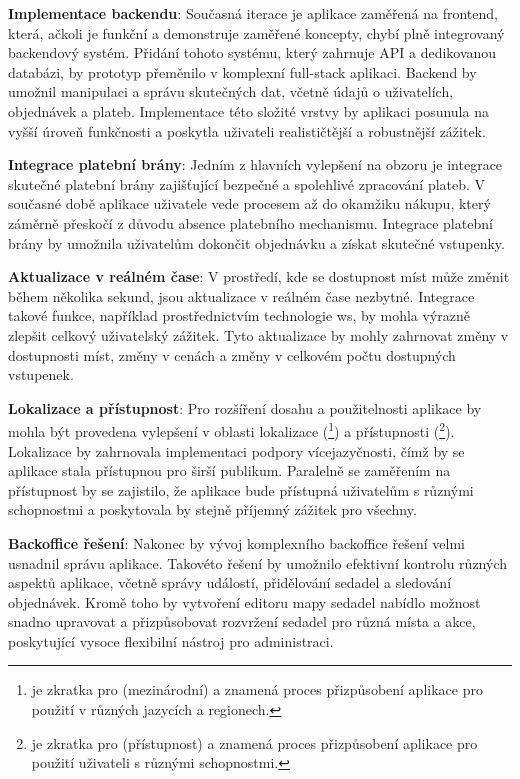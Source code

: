 \textbf{Implementace backendu}: Současná iterace je aplikace zaměřená na frontend, která, ačkoli je funkční a demonstruje zaměřené koncepty, chybí plně integrovaný backendový systém.
Přidání tohoto systému, který zahrnuje API a dedikovanou databázi, by prototyp přeměnilo v komplexní full-stack aplikaci.
Backend by umožnil manipulaci a správu skutečných dat, včetně údajů o uživatelích, objednávek a plateb.
Implementace této složité vrstvy by aplikaci posunula na vyšší úroveň funkčnosti a poskytla uživateli realističtější a robustnější zážitek.

\textbf{Integrace platební brány}: Jedním z hlavních vylepšení na obzoru je integrace skutečné platební brány zajišťující bezpečné a spolehlivé zpracování plateb.
V současné době aplikace uživatele vede procesem až do okamžiku nákupu, který záměrně přeskočí z důvodu absence platebního mechanismu.
Integrace platební brány by umožnila uživatelům dokončit objednávku a získat skutečné vstupenky.

\textbf{Aktualizace v reálném čase}: V prostředí, kde se dostupnost míst může změnit během několika sekund, jsou aktualizace v reálném čase nezbytné.
Integrace takové funkce, například prostřednictvím technologie \ac{ws}, by mohla výrazně zlepšit celkový uživatelský zážitek.
Tyto aktualizace by mohly zahrnovat změny v dostupnosti míst, změny v cenách a změny v celkovém počtu dostupných vstupenek.

\textbf{Lokalizace a přístupnost}: Pro rozšíření dosahu a použitelnosti aplikace by mohla být provedena vylepšení v oblasti lokalizace (\footnote{ je zkratka pro  (mezinárodní) a znamená proces přizpůsobení aplikace pro použití v různých jazycích a regionech.}) a přístupnosti (\footnote{ je zkratka pro  (přístupnost) a znamená proces přizpůsobení aplikace pro použití uživateli s různými schopnostmi.}).
Lokalizace by zahrnovala implementaci podpory vícejazyčnosti, čímž by se aplikace stala přístupnou pro širší publikum.
Paralelně se zaměřením na přístupnost by se zajistilo, že aplikace bude přístupná uživatelům s různými schopnostmi a poskytovala by stejně příjemný zážitek pro všechny.

\textbf{Backoffice řešení}: Nakonec by vývoj komplexního backoffice řešení velmi usnadnil správu aplikace.
Takovéto řešení by umožnilo efektivní kontrolu různých aspektů aplikace, včetně správy událostí, přidělování sedadel a sledování objednávek.
Kromě toho by vytvoření editoru mapy sedadel nabídlo možnost snadno upravovat a přizpůsobovat rozvržení sedadel pro různá místa a akce, poskytující vysoce flexibilní nástroj pro administraci.

